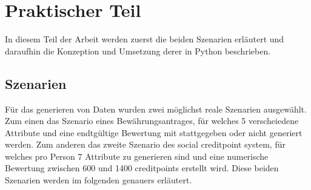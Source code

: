 \chapter{Praktischer Teil}
\label{sec:praktischerteil}
\begin{onehalfspace}
In diesem Teil der Arbeit werden zuerst die beiden Szenarien erläutert und daraufhin die Konzeption und Umsetzung derer in Python beschrieben.
\section{Szenarien}
\label{subsec:szenarien}
Für das generieren von Daten wurden zwei möglichst reale Szenarien ausgewählt. Zum einen das Szenario eines Bewährungsantrages, für welches 5 verscheiedene Attribute und eine endtgültige Bewertung mit stattgegeben oder nicht generiert werden. Zum anderen das zweite Szenario des social creditpoint system, für welches pro Person 7 Attribute zu generieren sind und eine numerische Bewertung zwischen 600 und 1400 creditpoints erstellt wird. Diese beiden Szenarien werden im folgenden genauers erläutert.

\end{onehalfspace}
